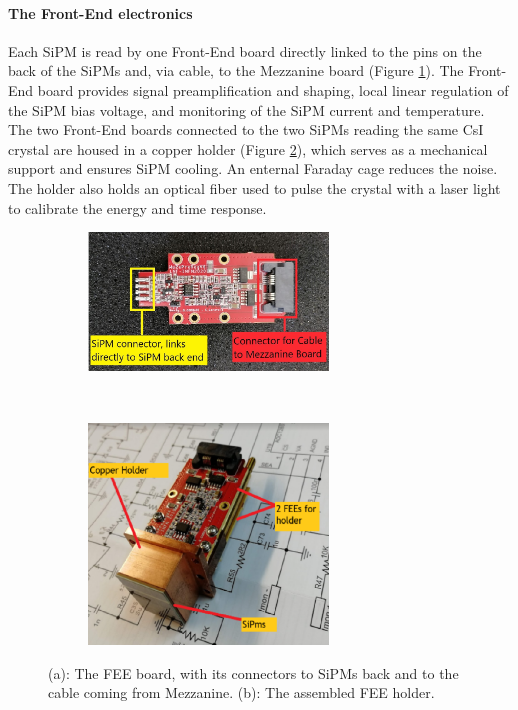 \paragraph{The Front-End electronics}
Each SiPM is read by one Front-End board directly linked to the pins on the 
back of the SiPMs and, via cable, to the Mezzanine board (Figure \ref{fig:connectiontomezzanine}). 
The Front-End board provides signal preamplification and shaping, local linear 
regulation of the SiPM bias voltage, and monitoring of the SiPM current and temperature. 
The two Front-End boards connected to the two SiPMs reading the same CsI 
crystal are housed in a copper holder (Figure \ref{fig:holder}), which 
serves as a mechanical support and ensures  SiPM cooling. 
An enternal Faraday cage reduces the noise. The holder also holds 
an optical fiber used to pulse the crystal with a laser light to 
calibrate the energy and time response.
\begin{figure}[!h]
    \centering
    \begin{subfigure}[t]{0.5\textwidth}
        \centering
        \includegraphics[width=0.7\textwidth]{figures/png/Screenshot_20240706_143204.png}
        \caption{}
        \label{fig:connectiontomezzanine}
    \end{subfigure}%
    ~ 
    \begin{subfigure}[t]{0.5\textwidth}
        \centering
        \includegraphics[width=0.7\textwidth]{figures/png/Screenshot_20240706_143517.png}
        \caption{}
        \label{fig:holder}
    \end{subfigure}
   \caption[The calorimeter FEE board.]{(a): The FEE board, with its connectors to SiPMs 
   back and to the cable coming from Mezzanine. 
   (b): The assembled FEE holder.}
    \label{fig:calooo}
  \end{figure}


